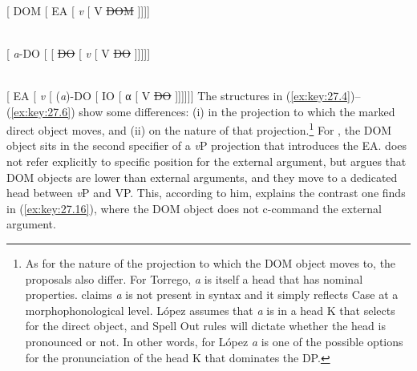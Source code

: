 \documentclass[output=paper]{langsci/langscibook}
\begin{document}
\ea\label{ex:key:27.13} \citet{Torrego1998}\\
    {}[ DOM [
    \gls{EA} [  \emph{v}   [  V  \sout{DOM} ]]]]
\z

\ea\label{ex:key:27.14} \citet{Rodriguez-Mondonedo2007}\\ {}[
\emph{a}-\gls{DO} [  \Dat{} [ \sout{\gls{DO}}
[ \emph{v} [ V \sout{\gls{DO}} ]]]]]
\z

\ea\label{ex:key:27.15} \citet{Lopez2012}\\
{}[ \gls{EA} [ \emph{v} [
(\emph{a})-\gls{DO} [ \gls{IO} [ α [ V \sout{\gls{DO}} ]]]]]]
\z
The structures in (\ref{ex:key:27.4})--(\ref{ex:key:27.6}) show some
differences: (i) in the projection to which the marked direct object moves, and
(ii) on the nature of that projection.\footnote{As for the nature of the
    projection to which the DOM object moves
    to, the proposals also differ. For Torrego, \emph{a} is itself a head that
    has nominal properties.  \citeauthor{Rodriguez-Mondonedo2007} claims
    \emph{a} is not present in syntax and it simply reflects Case at a
    morphophonological level.  López assumes that \emph{a} is in a head K that
selects for the direct object, and Spell Out rules will dictate whether the
head is pronounced or not.  In other words, for López \emph{a} is one of the
possible options for the pronunciation of the head K that dominates the DP\@.}
For \citet{Torrego1998}, the DOM object sits in
the second specifier of a \emph{v}P projection that introduces the \gls{EA}.
\textcite{Rodriguez-Mondonedo2007} does not refer explicitly to specific
position for the external argument, but \textcite{Lopez2012} argues that
DOM objects are lower than external arguments,
and they move to a dedicated head between \emph{v}P and VP\@. This, according
to him, explains the contrast one finds in (\ref{ex:key:27.16}), where the
DOM object does not c-command the external
argument.\newline
\end{document}
